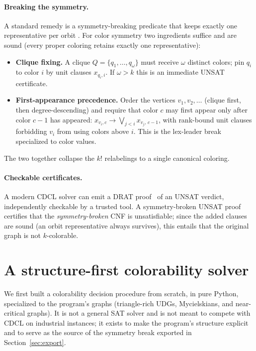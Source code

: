 \documentclass[11pt]{article}
\theoremstyle{definition}
\begin{document}
\paragraph{Breaking the symmetry.} A standard remedy is a symmetry-breaking
predicate that keeps exactly one representative per orbit
\cite{CrawfordSymmetry1996, SakallahSymmetry2009}. For color symmetry two
ingredients suffice and are sound (every proper coloring retains exactly one
representative):
\begin{itemize}
  \item \textbf{Clique fixing.} A clique $Q = \{q_1,\dots,q_\omega\}$ must receive
        $\omega$ distinct colors; pin $q_i$ to color $i$ by unit clauses
        $x_{q_i,i}$. If $\omega > k$ this is an immediate UNSAT certificate.
  \item \textbf{First-appearance precedence.} Order the vertices $v_1,v_2,\dots$
        (clique first, then degree-descending) and require that color $c$ may
        first appear only after color $c-1$ has appeared:
        $x_{v_i,c} \rightarrow \bigvee_{j<i} x_{v_j,\,c-1}$, with rank-bound unit
        clauses forbidding $v_i$ from using colors above $i$. This is the
        lex-leader break specialized to color values.
\end{itemize}
The two together collapse the $k!$ relabelings to a single canonical coloring.

\paragraph{Checkable certificates.} A modern CDCL solver can emit a DRAT
proof~\cite{WetzlerHeuleHunt2014} of an UNSAT verdict, independently checkable by
a trusted tool. A symmetry-broken UNSAT proof certifies that the
\emph{symmetry-broken} CNF is unsatisfiable; since the added clauses are sound (an
orbit representative always survives), this entails that the original graph is not
$k$-colorable.

\section{A structure-first colorability solver}
\label{sec:solver}

We first built a colorability decision procedure from scratch, in pure Python,
specialized to the program's graphs (triangle-rich UDGs, Mycielskians, and
near-critical graphs). It is not a general SAT solver and is not meant to compete
with CDCL on industrial instances; it exists to make the program's structure
explicit and to serve as the source of the symmetry break exported in
Section~\ref{sec:export}.
\end{document}

